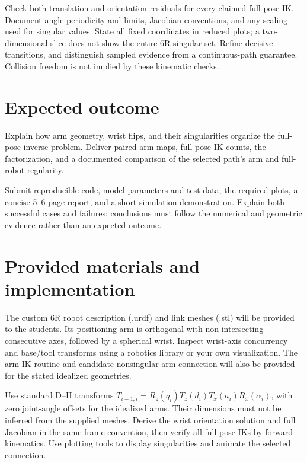\documentclass[11pt,a4paper]{article}
\begin{document}
Check both translation and orientation residuals
for every claimed full-pose IK. Document angle periodicity and limits,
Jacobian conventions, and any scaling used for singular values. State all
fixed coordinates in reduced plots; a two-dimensional slice does not show
the entire 6R singular set. Refine decisive transitions, and distinguish
sampled evidence from a continuous-path guarantee. Collision freedom is
not implied by these kinematic checks.

\section*{Expected outcome}
Explain how arm geometry, wrist flips, and their singularities organize
the full-pose inverse problem. Deliver paired arm maps, full-pose IK counts,
the factorization, and a documented comparison of the selected path's arm and
full-robot regularity.

Submit reproducible code, model parameters and test data, the required plots,
a concise 5--6-page report, and a short simulation demonstration. Explain
both successful cases and failures; conclusions must follow the numerical
and geometric evidence rather than an expected outcome.

\section*{Provided materials and implementation}
The custom 6R robot description (.urdf) and link meshes (.stl) will be provided
to the students. Its positioning arm is orthogonal with non-intersecting
consecutive axes, followed by a spherical wrist. Inspect wrist-axis concurrency
and base/tool transforms using a robotics library or your own visualization.
The arm IK routine and candidate nonsingular arm connection will also be
provided for the stated idealized geometries.

Use standard D--H transforms
$T_{i-1,i}=R_z(q_i)T_z(d_i)T_x(a_i)R_x(\alpha_i)$, with zero joint-angle
offsets for the idealized arms. Their dimensions must not be inferred from
the supplied meshes. Derive the wrist orientation solution and full Jacobian
in the same frame convention, then verify all full-pose IKs by forward
kinematics. Use plotting tools to display singularities and animate the
selected connection.
\end{document}

